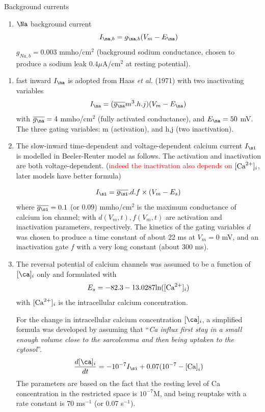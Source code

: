 Background currents
\begin{enumerate}
  \item $\Na$ background current
  \begin{equation}
  I_{\na,b} = g_{\na,b}(V_m-E_\na)
  \end{equation}
  $g_{Na,b}=0.003$ mmho/cm$^2$ (background sodium conductance, chosen
  to produce a sodium leak $0.4\mu$A/cm$^2$ at resting potential).
  
\end{enumerate}
\begin{enumerate}
\item fast inward $I_\na$ is adopted from Haas {\it et al.} (1971)
  with two inactivating variables
  \begin{equation}
    \label{eq:85}
    I_\na = (\overline{g_\na}m^3.h.j) (V_m-E_\na) 
  \end{equation}
  with $\overline{g_\na} = 4$ mmho/cm$^2$ (fully activated conductance),
  and  $E_\na = 50$ mV. The three gating variables: m (activation), and
  h,j (two inactivation).

\item The slow-inward time-dependent and voltage-dependent calcium
  current $I_\si$ is modelled in Beeler-Reuter model as follows. The
  activation and inactivation are both voltage-dependent.
  (\textcolor{red}{indeed the inactivation also depends on}
    $[{\text{Ca}^{2+}} ]_i$, later models have better formula)
    
  \begin{equation}
    \label{eq:81}
    I_\si = \overline{g_\si} .d .f \times (V_m-E_s)
  \end{equation}
  where $\overline{g_\si}=0.1$ (or 0.09) mmho/cm$^2$ is the maximum
  conductance of calcium ion channel; with $d(V_m,t),f(V_m,t)$ are
  activation and inactivation parameters, respectively. The kinetics
  of the gating variables $d$ was chosen to produce a time constant of
  about 22 ms at $V_m=0$ mV, and an inactivation gate $f$ with a very
  long constant (about 300 ms).

\item The reversal potential of calcium channels was assumed to be a
  function of $[\ca]_i$ only and formulated with
  \begin{equation}
    \label{eq:620}
    E_s = -82.3 - 13.0287{\text{ln}}([{\text{Ca}^{2+}}]_{i})
  \end{equation}
  with $[{\text{Ca}^{2+}}]_{i}$ is the intracellular calcium concentration.
  
  For the change in intracellular calcium concentration $[\ca]_i$, a
  simplified formula was developed by assuming that
  ``{\it Ca influx first stay in a small enough volume close to the
    sarcolemma and then being uptaken to the cytosol}''.
  \begin{equation}
    \label{eq:400}
    \frac{d[\ca]_{i}}{dt} = -10^{-7}I_\si + 0.07 (10^{-7}-\ce{[Ca]}_{i})
  \end{equation}
  The parameters are based on the fact that the resting level of Ca
  concentration in the restricted space is $10^{-7}$M, and being
  reuptake with a rate constant is 70 ms$^{-1}$ (or 0.07 s$^{-1}$).


\end{enumerate}
